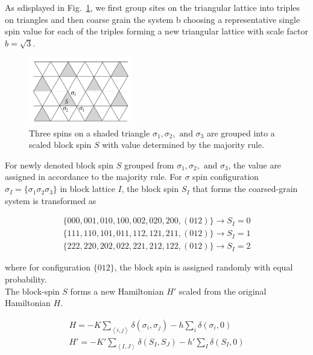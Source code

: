\documentclass[%
 reprint,
 amsmath,amssymb,
 aps,
]{revtex4-2}
\begin{document}
As sdisplayed in Fig.~\ref{fig:tri}, we first group sites on the triangular lattice into 
triples on triangles and then coarse grain the system b choosing a representative single 
spin value for each of the triples forming a new triangular lattice with scale factor 
$b=\sqrt 3$. \\

\begin{figure}[b]
\includegraphics[width=0.4\textwidth]{../fig/triangular lattice.JPG}
\caption{\label{fig:tri} Three spins on a shaded triangle $\sigma_{1}, \sigma_{2}, 
\text{ and } \sigma_{3}$ are grouped into a scaled block spin $S$ with value determined
by the majority rule.}
\end{figure}

For newly denoted block spin $S$ grouped from $\sigma_{1}, \sigma_{2}, \text{ and } 
\sigma_{3}$, the value are assigned in accordance to the majority rule. For $\sigma$
spin configuration $\sigma_{I} = \{\sigma_{1}\sigma_{2}\sigma_{3}\}$ in block lattice $I$, 
the block spin $S_{I}$ that forms the coarsed-grain system is transformed as

\begin{gather}
\{000, 001, 010, 100, 002, 020, 200, (012) \} \rightarrow S_{I}=0 \\
\{111, 110, 101, 011, 112, 121, 211, (012) \} \rightarrow S_{I}=1 \\
\{222, 220, 202, 022, 221, 212, 122, (012) \} \rightarrow S_{I}=2
\end{gather}

where for configuration $\{012\}$, the block spin is assigned randomly with equal 
probability. \\

The block-spin $S$ forms a new Hamiltonian $H'$ scaled from the original Hamiltonian $H$.

\begin{gather}
H = -K\sum_{\left<i,j\right>}\delta(\sigma_{i}, \sigma_{j}) -h\sum_{i}\delta(\sigma_{i},0) \\
H'= -K'\sum_{\left<I,J\right>}\delta(S_{I}, S_{J}) -h'\sum_{I}\delta(S_{I},0) \label{eqn:Hpri}
\end{gather}
\end{document}
